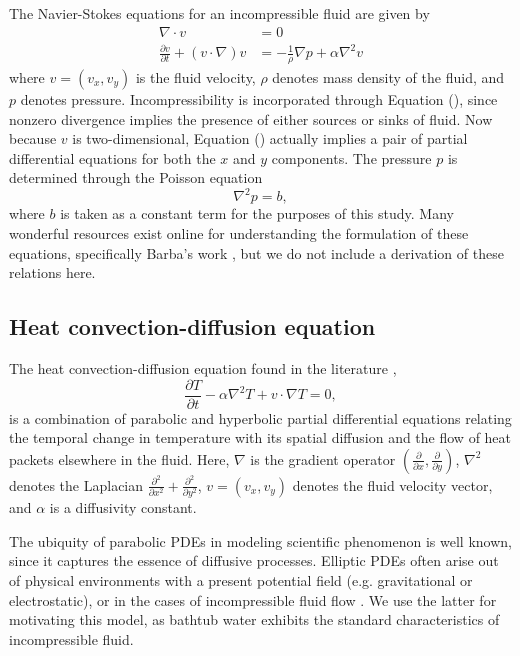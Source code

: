 \documentclass[12pt]{amsart}
\begin{document}
The Navier-Stokes equations for an incompressible fluid are given by
\begin{align}
    \nabla \cdot v &= 0 \\
    \frac{\partial v}{\partial t} + (v \cdot \nabla) v &= -
    \frac{1}{\rho} \nabla p + \alpha \nabla^2 v
    \label{eq:\theequation}
\end{align}
where $v = (v_x, v_y)$ is the fluid velocity, $\rho$ denotes mass density of
the fluid, and $p$ denotes pressure. Incompressibility is incorporated
through Equation (), since nonzero divergence implies the presence of either
sources or sinks of fluid. Now because $v$ is two-dimensional, Equation
() actually implies a pair of partial differential equations for both the $x$
and $y$ components. The pressure $p$ is determined through the Poisson equation
\begin{equation}
    \nabla^2 p = b,
    \label{eq:\theequation}
\end{equation}
where $b$ is taken as a constant term for the purposes of this study. Many
wonderful resources exist online for understanding the formulation of these
equations, specifically Barba's work \cite{12-steps}, but we do not include a
derivation of these relations here.

\subsection{Heat convection-diffusion equation}

The heat convection-diffusion equation found in the literature
\cite{convection-diffusion},
\begin{equation}
    \frac{\partial T}{\partial t} - \alpha \nabla^2 T + v \cdot \nabla T =
    0,
    \label{eq:\theequation}
\end{equation}
is a combination of parabolic and hyperbolic partial differential equations
relating the temporal change in temperature with its spatial diffusion and
the flow of heat packets elsewhere in the fluid.     Here, $\nabla$ is the
gradient operator $\left( \frac{\partial}{\partial x},
\frac{\partial}{\partial y} \right)$, $\nabla^2$ denotes the Laplacian
$\frac{\partial^2}{\partial x^2} + \frac{\partial^2}{\partial y^2}$, $v =
(v_x, v_y)$ denotes the fluid velocity vector, and $\alpha$ is a diffusivity
constant.

The ubiquity of parabolic PDEs in modeling scientific phenomenon is well
known, since it captures the essence of diffusive processes. Elliptic PDEs
often arise out of physical environments with a present potential field
(e.g.  gravitational or electrostatic), or in the cases of incompressible
fluid flow \cite{convection-diffusion, ames}. We use the latter for
motivating this model, as bathtub water exhibits the standard
characteristics of incompressible fluid.
\end{document}
